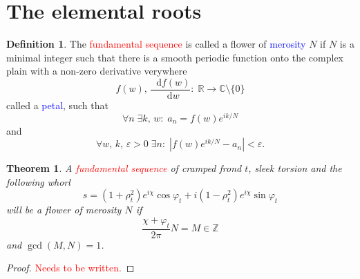 \documentclass{article}
\newcommand*\df {\mathop{}\!\mathrm{d}}
\newcommand{\red}[1]{\textcolor{red}{#1}}
\newcommand{\blue}[1]{\textcolor{blue}{#1}}
\theoremstyle{plain}
\newtheorem{theorem}{Theorem}[section]
\theoremstyle{definition}
\newtheorem{definition}{Definition}[section]
\newcommand{\cmz}{\mathbb C \setminus \{0\} }
\begin{document}
\section{The elemental roots}
    \begin{definition}
        The \red{fundamental sequence} is called a flower of \blue{merosity} $N$ if $N$ is a minimal integer such that there is a smooth periodic function onto the complex plain with a non-zero derivative verywhere $$
            f(w),\,\frac{\df{f(w)}}{\df{w}}:\; \mathbb R \rightarrow \cmz 
        $$ called a \blue{petal}, such that $$
            \forall n \; \exists k,\,w:\; a_n  = f(w) e^{i{k}/{N}}
        $$ and $$
            \forall w,\,k,\,\varepsilon >0 \; \exists n :\; \left| f(w)e^{i{k}/{N}} - a_n  \right|<\varepsilon
        .$$
        
    \end{definition} 

    \begin{theorem}
        A \red{fundamental sequence} of cramped frond $t$, sleek torsion
        and the following whorl
        $$
            s = \left(1+\rho_t^2\right)e^{i\chi}\cos\varphi_t + i\left(1-\rho_t^2\right) e^{i\chi}\sin\varphi_t 
        $$ will be a flower of merosity $N$ if $$
            \frac{\chi+\varphi_t}{2\pi}N= M\in \mathbb Z
        $$ and $  \gcd(M,N)=1$.
    \end{theorem}
    \begin{proof}
        \red{Needs to be written.}
    \end{proof}
\end{document}
